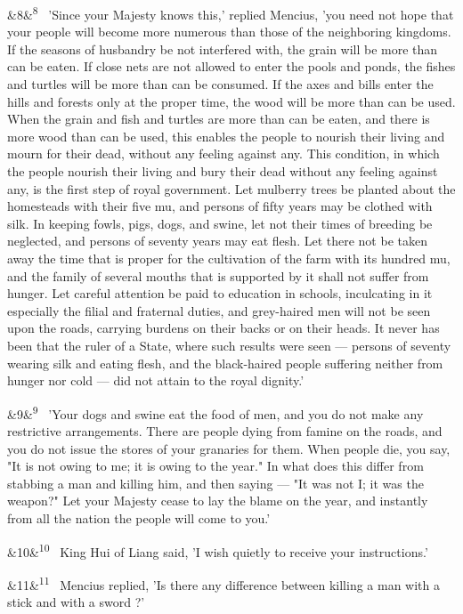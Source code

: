 \documentclass[12pt]{article}
\newcommand{\para}[1][]{\par\noindent\ifx&#1&\else\textsuperscript{\footnotesize #1}~\fi}
\begin{document}
\para[8] 'Since your Majesty knows this,' replied Mencius, 'you need not hope that your people will become more numerous than those of the neighboring kingdoms. If the seasons of husbandry be not interfered with, the grain will be more than can be eaten. If close nets are not allowed to enter the pools and ponds, the fishes and turtles will be more than can be consumed. If the axes and bills enter the hills and forests only at the proper time, the wood will be more than can be used. When the grain and fish and turtles are more than can be eaten, and there is more wood than can be used, this enables the people to nourish their living and mourn for their dead, without any feeling against any. This condition, in which the people nourish their living and bury their dead without any feeling against any, is the first step of royal government. Let mulberry trees be planted about the homesteads with their five mu, and persons of fifty years may be clothed with silk. In keeping fowls, pigs, dogs, and swine, let not their times of breeding be neglected, and persons of seventy years may eat flesh. Let there not be taken away the time that is proper for the cultivation of the farm with its hundred mu, and the family of several mouths that is supported by it shall not suffer from hunger. Let careful attention be paid to education in schools, inculcating in it especially the filial and fraternal duties, and grey-haired men will not be seen upon the roads, carrying burdens on their backs or on their heads. It never has been that the ruler of a State, where such results were seen --- persons of seventy wearing silk and eating flesh, and the black-haired people suffering neither from hunger nor cold --- did not attain to the royal dignity.'

\para[9] 'Your dogs and swine eat the food of men, and you do not make any restrictive arrangements. There are people dying from famine on the roads, and you do not issue the stores of your granaries for them. When people die, you say, "It is not owing to me; it is owing to the year." In what does this differ from stabbing a man and killing him, and then saying --- "It was not I; it was the weapon?" Let your Majesty cease to lay the blame on the year, and instantly from all the nation the people will come to you.'

\para[10] King Hui of Liang said, 'I wish quietly to receive your instructions.'

\para[11] Mencius replied, 'Is there any difference between killing a man with a stick and with a sword ?'
\end{document}
